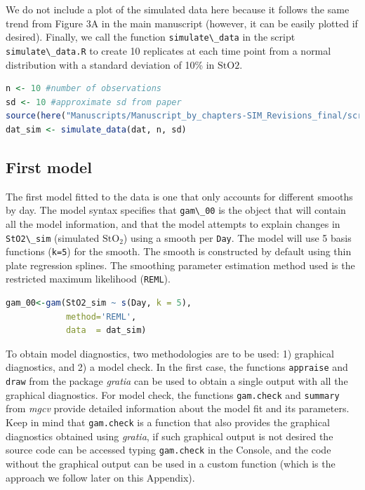 \documentclass[
]{article}
\newcommand{\passthrough}[1]{#1}
\begin{document}
We do not include a plot of the simulated data here because it follows the same trend from Figure 3A in the main manuscript (however, it can be easily plotted if desired).
Finally, we call the function \passthrough{\lstinline!simulate\_data!} in the script \passthrough{\lstinline!simulate\_data.R!} to create 10 replicates at each time point from a normal distribution with a standard deviation of 10\% in \(\mbox{StO2}\).

\begin{lstlisting}[language=R]
n <- 10 #number of observations
sd <- 10 #approximate sd from paper
source(here("Manuscripts/Manuscript_by_chapters-SIM_Revisions_final/scripts","simulate_data.R"))
dat_sim <- simulate_data(dat, n, sd)
\end{lstlisting}

\hypertarget{first-model}{%
\subsection{First model}\label{first-model}}

The first model fitted to the data is one that only accounts for different smooths by day. The model syntax specifies that \passthrough{\lstinline!gam\_00!} is the object that will contain all the model information, and that the model attempts to explain changes in \passthrough{\lstinline!StO2\_sim!} (simulated \(\mbox{StO}_2\)) using a smooth per \passthrough{\lstinline!Day!}. The model will use 5 basis functions (\passthrough{\lstinline!k=5!}) for the smooth. The smooth is constructed by default using thin plate regression splines. The smoothing parameter estimation method used is the restricted maximum likelihood (\passthrough{\lstinline!REML!}).

\begin{lstlisting}[language=R]
gam_00<-gam(StO2_sim ~ s(Day, k = 5),
            method='REML',
            data  = dat_sim)
\end{lstlisting}

To obtain model diagnostics, two methodologies are to be used: 1) graphical diagnostics, and 2) a model check. In the first case, the functions \passthrough{\lstinline!appraise!} and \passthrough{\lstinline!draw!} from the package \emph{gratia} can be used to obtain a single output with all the graphical diagnostics. For model check, the functions \passthrough{\lstinline!gam.check!} and \passthrough{\lstinline!summary!} from \emph{mgcv} provide detailed information about the model fit and its parameters. Keep in mind that \passthrough{\lstinline!gam.check!} is a function that also provides the graphical diagnostics obtained using \emph{gratia}, if such graphical output is not desired the source code can be accessed typing \passthrough{\lstinline!gam.check!} in the Console, and the code without the graphical output can be used in a custom function (which is the approach we follow later on this Appendix).
\end{document}
